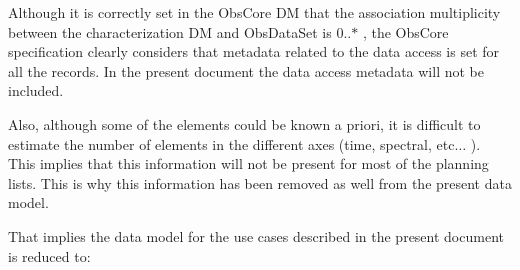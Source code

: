 \documentclass[11pt,a4paper]{ivoa}
\begin{document}
Although it is correctly set in the ObsCore DM that the association multiplicity between the characterization DM and ObsDataSet is 0..$\ast$ , the ObsCore specification clearly considers that metadata related to the data access is set for all the records. In the present document the data access metadata will not be included.

Also, although some of the elements could be known a priori, it is difficult to estimate the number of elements in the different axes (time, spectral, etc$ \ldots $ ). This implies that this information will not be present for most of the planning lists. This is why this information has been removed as well from the present data model.

That implies the data model for the use cases described in the present document is reduced to:
\end{document}
